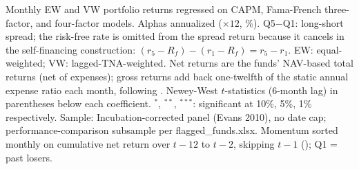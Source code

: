 \begin{table}[!htbp]
\begin{minipage}{\tabletempwidth}
\caption{Alpha and Factor Loadings by Momentum Quintile, Active Funds (\%, Annualized)}\label{tab:port_mom_alpha}
\ifdim\wd\tabletempbox>\linewidth
  \resizebox{\linewidth}{!}{\usebox{\tabletempbox}}
\else
  \usebox{\tabletempbox}
\fi
\par\medskip
\begin{singlespace}\tablefont\noindent
Monthly EW and VW portfolio returns regressed on CAPM, Fama-French three-factor, and \textcite{Carhart1997} four-factor models. Alphas annualized ($\times 12$, \%). Q5$-$Q1: long-short spread; the risk-free rate is omitted from the spread return because it cancels in the self-financing construction: $(r_5 - R_f) - (r_1 - R_f) = r_5 - r_1$. EW: equal-weighted; VW: lagged-TNA-weighted. Net returns are the funds' NAV-based total returns (net of expenses); gross returns add back one-twelfth of the static annual expense ratio each month, following \textcite{FamaFrench2010}. Newey-West $t$-statistics (6-month lag) in parentheses below each coefficient. $^{*}$, $^{**}$, $^{***}$: significant at 10\%, 5\%, 1\% respectively. Sample: Incubation-corrected panel (Evans 2010), no date cap; performance-comparison subsample per flagged\_funds.xlsx. Momentum sorted monthly on cumulative net return over $t-12$ to $t-2$, skipping $t-1$ (\citealt{JegadeeshTitman1993}); Q1 = past losers.
\end{singlespace}
\end{minipage}
\end{table}

